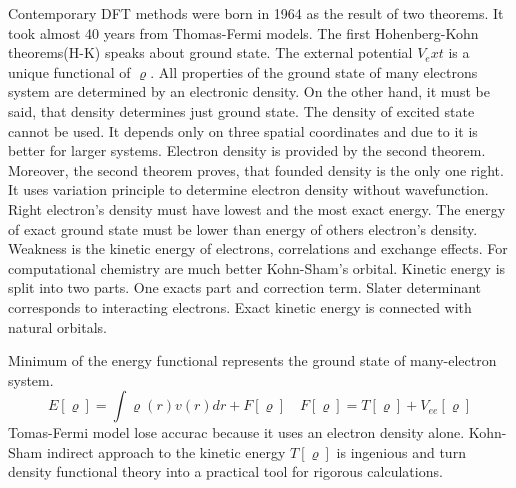 \documentclass[
  digital, %
  table,   %
  lof,     %
  lot,     %
]{fithesis3}
\begin{document}
Contemporary DFT methods were born in 1964 as the result of two theorems. It took almost 40 years from Thomas-Fermi models. The first Hohenberg-Kohn theorems(H-K) speaks about ground state. The external potential $V_ext$ is a unique functional of $\varrho$. All properties of the ground state of many electrons system are determined by an electronic density. On the other hand, it must be said, that density determines just ground state. The density of excited state cannot be used. It depends only on three spatial coordinates and due to it is better for larger systems.
Electron density is provided by the second theorem. Moreover, the second theorem proves, that founded density is the only one right. It uses variation principle to determine electron density without wavefunction. Right electron's density must have lowest and the most exact energy. The energy of exact ground state must be lower than energy of others electron's density. Weakness is the kinetic energy of electrons, correlations and exchange effects. For computational chemistry are much better Kohn-Sham's orbital. Kinetic energy is split into two parts. One exacts part and correction term.\cite{jensen2007introduction}\cite{koch2000chemist}
Slater determinant corresponds to interacting electrons. Exact kinetic energy is connected with natural orbitals.

Minimum of the energy functional represents the ground state of many-electron system.
\begin{equation}
  E[\varrho] = \int \varrho(r)v(r)dr + F[\varrho] \quad F[\varrho] = T[\varrho] + V_{ee}[\varrho]
\end{equation}
Tomas-Fermi model lose accurac because it uses an electron density alone. Kohn-Sham indirect approach to the kinetic energy $T[\varrho]$ is ingenious and turn density functional theory into a practical tool for rigorous calculations. \cite{parr1994density}
\end{document}
